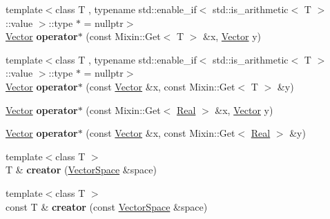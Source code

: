 \begin{DoxyCompactItemize}
\item 
\hypertarget{namespaceSpacy_a0e5e7a61e6d2996df2b3e86371d38dfa}{{\footnotesize template$<$class T , typename std\-::enable\-\_\-if$<$ std\-::is\-\_\-arithmetic$<$ T $>$\-::value $>$\-::type $\ast$  = nullptr$>$ }\\\hyperlink{classSpacy_1_1Vector}{Vector} {\bfseries operator$\ast$} (const Mixin\-::\-Get$<$ T $>$ \&x, \hyperlink{classSpacy_1_1Vector}{Vector} y)}\label{namespaceSpacy_a0e5e7a61e6d2996df2b3e86371d38dfa}

\item 
\hypertarget{namespaceSpacy_a6656b636307ec4d5552477027b724f46}{{\footnotesize template$<$class T , typename std\-::enable\-\_\-if$<$ std\-::is\-\_\-arithmetic$<$ T $>$\-::value $>$\-::type $\ast$  = nullptr$>$ }\\\hyperlink{classSpacy_1_1Vector}{Vector} {\bfseries operator$\ast$} (const \hyperlink{classSpacy_1_1Vector}{Vector} \&x, const Mixin\-::\-Get$<$ T $>$ \&y)}\label{namespaceSpacy_a6656b636307ec4d5552477027b724f46}

\item 
\hypertarget{namespaceSpacy_a011c3af8fa33fc2da22f9667edaeba29}{\hyperlink{classSpacy_1_1Vector}{Vector} {\bfseries operator$\ast$} (const Mixin\-::\-Get$<$ \hyperlink{classSpacy_1_1Real}{Real} $>$ \&x, \hyperlink{classSpacy_1_1Vector}{Vector} y)}\label{namespaceSpacy_a011c3af8fa33fc2da22f9667edaeba29}

\item 
\hypertarget{namespaceSpacy_a7ad73bdbb0377bd088f1007894a4a824}{\hyperlink{classSpacy_1_1Vector}{Vector} {\bfseries operator$\ast$} (const \hyperlink{classSpacy_1_1Vector}{Vector} \&x, const Mixin\-::\-Get$<$ \hyperlink{classSpacy_1_1Real}{Real} $>$ \&y)}\label{namespaceSpacy_a7ad73bdbb0377bd088f1007894a4a824}

\item 
\hypertarget{namespaceSpacy_affaca762d59da675eef594854762cdcd}{{\footnotesize template$<$class T $>$ }\\T \& {\bfseries creator} (\hyperlink{classSpacy_1_1VectorSpace}{Vector\-Space} \&space)}\label{namespaceSpacy_affaca762d59da675eef594854762cdcd}

\item 
\hypertarget{namespaceSpacy_aed55e3a3401be0e74e174a12858baffa}{{\footnotesize template$<$class T $>$ }\\const T \& {\bfseries creator} (const \hyperlink{classSpacy_1_1VectorSpace}{Vector\-Space} \&space)}\label{namespaceSpacy_aed55e3a3401be0e74e174a12858baffa}


\end{DoxyCompactItemize}
